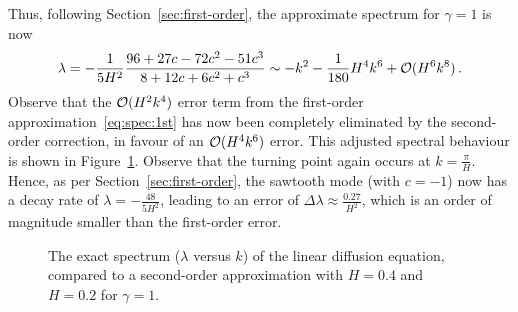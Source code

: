 \documentclass[12pt,a5paper]{article}
\begin{document}
Thus, following Section~\ref{sec:first-order}, the approximate spectrum for $\gamma=1$ is now
\begin{eqnarray}
\lambda = -\frac{1}{5H^2}\frac{96+27c-72c^2-51c^3}{8+12c+6c^2+c^3}
\sim -k^2-\frac{1}{180}H^4k^6+{\cal O}(H^6k^8)\,.
\end{eqnarray}
Observe that the ${\cal O}(H^2k^4)$ error term from the first-order approximation~\eqref{eq:spec:1st} has now been
completely eliminated by the second-order correction, in favour of an ${\cal O}(H^4k^6)$ error. 
This adjusted spectral behaviour is shown in Figure~\ref{fig:spec:2nd-order}.
Observe that the turning point again occurs at $k=\frac{\pi}{H}$. Hence,
as per Section~\ref{sec:first-order},
the sawtooth mode (with $c=-1$) now has a decay rate of $\lambda=-\frac{48}{5H^2}$, leading to an error of
$\Delta\lambda\approx\frac{0.27}{H^2}$, which is an order of magnitude smaller than the first-order error.
\begin{figure}[hbt]
\centering
\caption{The exact spectrum ($\lambda$ versus $k$) of the linear diffusion equation, compared to a second-order approximation with $H=0.4$ and $H=0.2$ for $\gamma=1$.}
\label{fig:spec:2nd-order}
\end{figure}
\end{document}
